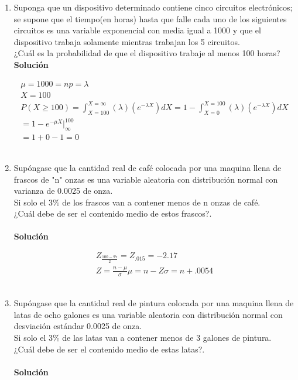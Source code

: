 \begin{enumerate}
    \item Suponga que un dispositivo determinado contiene cinco circuitos electrónicos; se supone que el tiempo(en horas) hasta que falle cada uno de los siguientes circuitos es una variable exponencial con media igual a 1000 y que el dispositivo trabaja solamente mientras trabajan los 5 circuitos.\\
    ¿Cuál es la probabilidad de que el dispositivo trabaje al menos 100 horas?
    \\\textbf{Solución}
    
    \begin{gather*}	 
    \mu = 1000 = np = \lambda\\
    X = 100\\
    P(X \ge  100) = \int_{X=100}^{X=\infty} (\lambda)(e^{-\lambda X})dX=1 - \int_{X = 0}^{X = 100} (\lambda)(e^{-\lambda X})dX\\
    = 1 - e^{-\mu X}|_{\infty}^{100}\\
    =1 + 0 - 1 = 0
    \end{gather*}\\
    
    \item Supóngase que la cantidad real de café colocada por una maquina llena de frascos de "n" onzas es una variable aleatoria con distribución normal con varianza de 0.0025 de onza.\\
    Si solo el 3\% de los frascos van a contener menos de n onzas de café.\\
    ¿Cuál debe de ser el contenido medio de estos frascos?.\\
    \\\textbf{Solución}
    
    \begin{gather*}	 
    Z_{\frac{100 - 97}{2}} = Z_{.015} = -2.17\\
    Z = \frac{n -\mu}{\sigma}
    \mu = n - Z\sigma = n + .0054
    \end{gather*}\\
    
    \item Supóngase que la cantidad real de pintura colocada por una maquina llena de latas de ocho galones es una variable aleatoria con distribución normal con desviación estándar 0.0025 de onza.\\
    Si solo el 3\% de las latas van a contener menos de 3 galones de pintura.\\
    ¿Cuál debe de ser el contenido medio de estas latas?.\\
    \\\textbf{Solución}
    

\end{enumerate}
